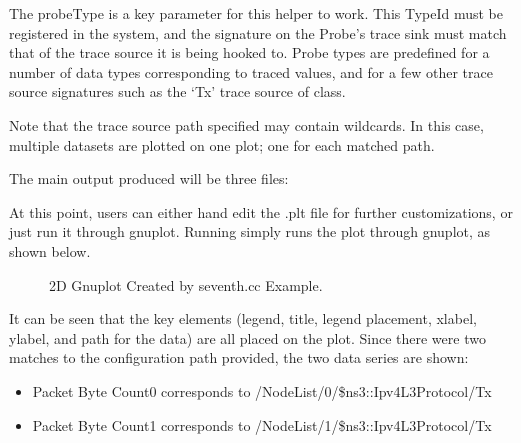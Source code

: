 \documentclass[letterpaper,10pt,english]{sphinxmanual}
\renewcommand{\sphinxcode}[1]{\texttt{\small{#1}}}
\begin{document}
The probeType is a key parameter for this helper to work.  This TypeId
must be registered in the system, and the signature on the Probe’s trace
sink must match that of the trace source it is being hooked to.  Probe
types are pre\sphinxhyphen{}defined for a number of data types corresponding to 
traced values, and for a few other trace source signatures such as the
‘Tx’ trace source of \sphinxcode{} class.

Note that the trace source path specified may contain wildcards.
In this case, multiple
datasets are plotted on one plot; one for each matched path.

The main output produced will be three files:

\begin{sphinxVerbatim}[commandchars=\\\{\}]
\end{sphinxVerbatim}

At this point, users can either hand edit the .plt file for further
customizations, or just run it through gnuplot.  Running
 simply runs the plot through gnuplot,
as shown below.

\begin{figure}[htbp]
\centering
\capstart

\noindent{}
\caption{2\sphinxhyphen{}D Gnuplot Created by seventh.cc Example.}\label{\detokenize{data-collection-helpers:id3}}\label{\detokenize{data-collection-helpers:seventh-packet-byte-count}}\end{figure}

It can be seen that the key elements (legend, title, legend placement,
xlabel, ylabel, and path for the data) are all placed on the plot.
Since there were two matches to the configuration path provided, the
two data series are shown:
\begin{itemize}
\item {} 
Packet Byte Count\sphinxhyphen{}0 corresponds to /NodeList/0/\$ns3::Ipv4L3Protocol/Tx

\item {} 
Packet Byte Count\sphinxhyphen{}1 corresponds to /NodeList/1/\$ns3::Ipv4L3Protocol/Tx

\end{itemize}
\end{document}
